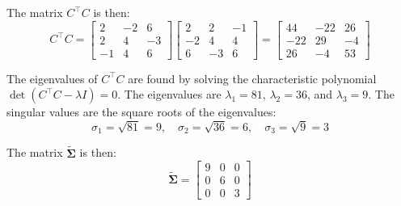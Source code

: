 \begin{homeworkProblem}
\begin{solution}
\begin{itemize}
                The matrix $C^\top C$ is then:
                \[
                    C^\top C = \begin{bmatrix}
                        2 & -2 & 6 \\
                        2 & 4 & -3 \\
                        -1 & 4 & 6
                    \end{bmatrix}
                    \begin{bmatrix}
                        2 & 2 & -1 \\
                        -2 & 4 & 4 \\
                        6 & -3 & 6
                    \end{bmatrix}
                    = \begin{bmatrix}
                        44 & -22 & 26 \\
                        -22 & 29 & -4 \\
                        26 & -4 & 53
                    \end{bmatrix}
                \]

                The eigenvalues of $C^\top C$ are found by solving the 
                characteristic polynomial $\det(C^\top C - \lambda I) = 
                0$. The eigenvalues are $\lambda_1 = 81$, 
                $\lambda_2 = 36$, and $\lambda_3 = 9$. The singular values 
                are the square roots of the eigenvalues:
                \[
                    \sigma_1 = \sqrt{81} = 9, \quad
                    \sigma_2 = \sqrt{36} = 6, \quad
                    \sigma_3 = \sqrt{9} = 3
                \]

                The matrix $\tilde{\mathbf{\Sigma}}$ is then:
                \[
                    \tilde{\mathbf{\Sigma}} = \begin{bmatrix}
                        9 & 0 & 0 \\
                        0 & 6 & 0 \\
                        0 & 0 & 3
                    \end{bmatrix}
                \]


\end{itemize}
\end{solution}
\end{homeworkProblem}
